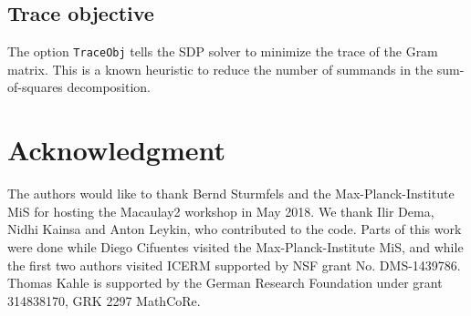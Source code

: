 \documentclass[11pt]{amsart}
\theoremstyle{plain}%
\theoremstyle{definition}
\theoremstyle{remark}
\newcommand{\Mac}{Macaulay2\xspace}
\begin{document}
\subsection*{Trace objective}
The option \verb|TraceObj| tells the SDP solver to minimize the trace of the Gram matrix.
This is a known heuristic to reduce the number of summands in the sum-of-squares decomposition.


\section*{Acknowledgment}
\label{sec:acknowledgement}
The authors would like to thank Bernd Sturmfels and the Max-Planck-Institute MiS for hosting the \Mac workshop in May 2018.
We thank Ilir Dema, Nidhi Kainsa and Anton Leykin, who contributed to the code.
Parts of this work were done while Diego Cifuentes visited the Max-Planck-Institute MiS, and while the first two authors visited ICERM supported by NSF grant No. DMS-1439786.
Thomas Kahle is supported by the German Research Foundation under grant 314838170, GRK 2297 MathCoRe.



\end{document}
